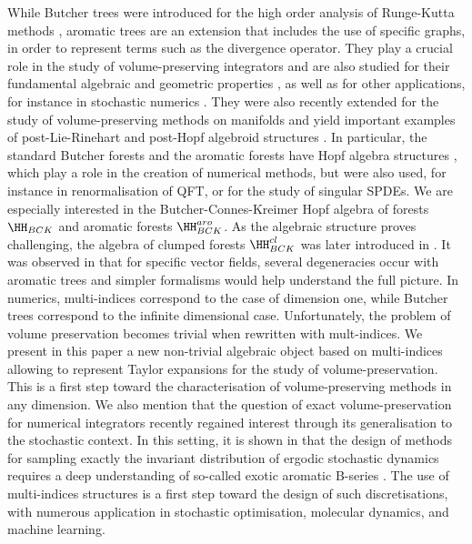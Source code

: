 \documentclass[a4paper,11pt]{article}
\begin{document}
While Butcher trees were introduced for the high order analysis of Runge-Kutta methods \cite{Butcher72aat, Hairer06gni}, aromatic trees are an extension that includes the use of specific graphs, in order to represent terms such as the divergence operator. They play a crucial role in the study of volume-preserving integrators \cite{Chartier07pfi, Iserles07bsm, Bogfjellmo22uat} and are also studied for their fundamental algebraic and geometric properties \cite{MuntheKaas16abs, McLachlan16bsm, Bogfjellmo19aso, Laurent23tab, Laurent23tld}, as well as for other applications, for instance in stochastic numerics \cite{Bronasco22cef}.
They were also recently extended for the study of volume-preserving methods on manifolds \cite{Busnot26tft} and yield important examples of post-Lie-Rinehart and post-Hopf algebroid structures \cite{Busnot25pha}.
In particular, the standard Butcher forests and the aromatic forests have Hopf algebra structures \cite{Connes98har,Chartier10aso,Bogfjellmo19aso,Bronasco22cef}, which play a role in the creation of numerical methods, but were also used, for instance in renormalisation of QFT, or for the study of singular SPDEs. We are especially interested in the Butcher-Connes-Kreimer Hopf algebra of forests $\HH_{BCK}$ and aromatic forests $\HH_{BCK}^{aro}$. As the algebraic structure proves challenging, the algebra of clumped forests $\HH_{BCK}^{cl}$ was later introduced in \cite{Bronasco22cef}.
It was observed in \cite{Bogfjellmo22uat} that for specific vector fields, several degeneracies occur with aromatic trees and simpler formalisms would help understand the full picture.
In numerics, multi-indices correspond to the case of dimension one, while Butcher trees correspond to the infinite dimensional case. Unfortunately, the problem of volume preservation becomes trivial when rewritten with mult-indices.
We present in this paper a new non-trivial algebraic object based on multi-indices allowing to represent Taylor expansions for the study of volume-preservation. This is a first step toward the characterisation of volume-preserving methods in any dimension.
We also mention that the question of exact volume-preservation for numerical integrators recently regained interest through its generalisation to the stochastic context. In this setting, it is shown in \cite{Laurent21ata, Bronasco22cef} that the design of methods for sampling exactly the invariant distribution of ergodic stochastic dynamics requires a deep understanding of so-called exotic aromatic B-series \cite{Laurent23tue}. The use of multi-indices structures is a first step toward the design of such discretisations, with numerous application in stochastic optimisation, molecular dynamics, and machine learning.
\end{document}

